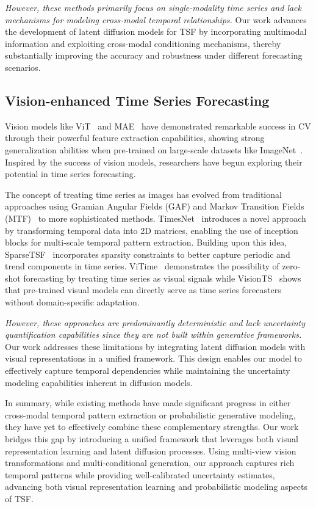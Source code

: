\textit{However, these methods primarily focus on single-modality time series and lack mechanisms for modeling cross-modal temporal relationships.} Our work advances the development of latent diffusion models for TSF by incorporating multimodal information and exploiting cross-modal conditioning mechanisms, thereby substantially improving the accuracy and robustness under different forecasting scenarios.

\subsection{Vision-enhanced Time Series Forecasting}
Vision models like ViT~\cite{dosovitskiy2020image} and MAE~\cite{he2022masked} have demonstrated remarkable success in CV through their powerful feature extraction capabilities, showing strong generalization abilities when pre-trained on large-scale datasets like ImageNet~\cite{deng2009imagenet}. Inspired by the success of vision models, researchers have begun exploring their potential in time series forecasting. 

The concept of treating time series as images has evolved from traditional approaches using Gramian Angular Fields (GAF) and Markov Transition Fields (MTF)~\cite{wang2015imaging} to more sophisticated methods. TimesNet~\cite{wu2022timesnet} introduces a novel approach by transforming temporal data into 2D matrices, enabling the use of inception blocks for multi-scale temporal pattern extraction. Building upon this idea, SparseTSF~\cite{lin2024sparsetsf} incorporates sparsity constraints to better capture periodic and trend components in time series. ViTime~\cite{yang2024vitime} demonstrates the possibility of zero-shot forecasting by treating time series as visual signals while VisionTS~\cite{chen2024visionts} shows that pre-trained visual models can directly serve as time series forecasters without domain-specific adaptation. 

\textit{However, these approaches are predominantly deterministic and lack uncertainty quantification capabilities since they are not built within generative frameworks.} Our work addresses these limitations by integrating latent diffusion models with visual representations in a unified framework. This design enables our model to effectively capture temporal dependencies while maintaining the uncertainty modeling capabilities inherent in diffusion models.

\par In summary, while existing methods have made significant progress in either cross-modal temporal pattern extraction or probabilistic generative modeling, they have yet to effectively combine these complementary strengths. Our work bridges this gap by introducing a unified framework that leverages both visual representation learning and latent diffusion processes. Using multi-view vision transformations and multi-conditional generation, our approach captures rich temporal patterns while providing well-calibrated uncertainty estimates, advancing both visual representation learning and probabilistic modeling aspects of TSF.
\vspace{-0.5em}